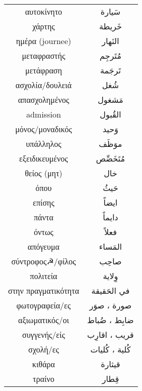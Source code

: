\documentclass[twocolumn,a4paper]{article}
\newcommand{\ar}[1]{\textarabic{#1}}
\begin{document}
\begin{supertabular}{ c c }
αυτοκίνητο  & \ar{ سَيارة } \\
χάρτης      & \ar{ خَريطة } \\
ημέρα (journee) & \ar{ النَهار } \\
μεταφραστής     & \ar{ مُتَرجِم } \\
μετάφραση       & \ar{ تَرجَمة } \\
ασχολία/δουλειά & \ar{ شُغل } \\
απασχολημένος   & \ar{ مَشغول } \\
admission   & \ar{ القُبول } \\
μόνος/μοναδικός & \ar{ وَحيد } \\
υπάλληλος   & \ar{ موَظَف } \\
εξειδικευμένος  & \ar{ مُتَخَصِّص } \\
θείος (μητ) & \ar{ خال } \\
όπου        & \ar{ حَيثُ } \\
επίσης      & \ar{ ايضاً } \\
πάντα       & \ar{ دايماً } \\
όντως       & \ar{ فعلاً } \\
απόγευμα    & \ar{ المَساء } \\
σύντροφος☭/φίλος & \ar{ صاحِب } \\
πολιτεία    & \ar{ وِﻻية } \\
στην πραγματικότητα & \ar{ في الحَقيقة } \\
φωτογραφεία/ες & \ar{ صورة ، صوَر } \\
αξιωματικός/οι & \ar{ ضابِط ، ضُباط } \\
συγγενής/είς   & \ar{ قريب ، اقارِب } \\
σχολή/ες       & \ar{ كُلية ، كُليات } \\
κιθάρα         & \ar{ قيثارة } \\
τραίνο         & \ar{ قِطار } \\


\end{supertabular}


\clearpage
\end{document}
